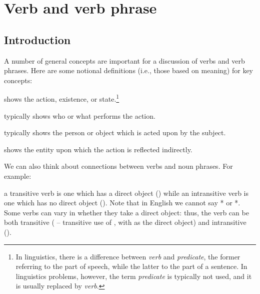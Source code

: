 \begin{refsection}
\hypertarget{verb}{%
\chapter{Verb and verb phrase}\label{chap-verb}}

\section{Introduction}

A number of general concepts are important for a discussion of verbs and verb phrases. Here are some notional definitions (i.e., those based on meaning) for key concepts:
 
\begin{description}[font=\normalfont\scshape]
    \item[verb:] shows the action, existence, or state.\footnote{In linguistics, there is a difference between \emph{verb} and \emph{predicate}, the former referring to the part of speech, while the latter to the part of a sentence. In linguistics problems, however, the term \emph{predicate} is typically not used, and it is usually replaced by \emph{verb}.}
    \item[subject:] typically shows who or what performs the action.
    \item[(direct) object:] typically shows the person or object which is acted upon by the subject.
    \item[indirect object:] shows the entity upon which the action is reflected indirectly.
\end{description}

\noindent We can also think about connections between verbs and noun phrases. For example:

\begin{description}[font=\normalfont\scshape]
    \item[transitive {\normalfont and} intransitive verb:] a transitive verb is one which has a direct object () while an intransitive verb is one which has no direct object (). Note that in English we cannot say * or *. Some verbs can vary in whether they take a direct object: thus, the verb  can be both transitive ( -- transitive use of , with  as the direct object) and intransitive ().
\end{description}


\end{refsection}
